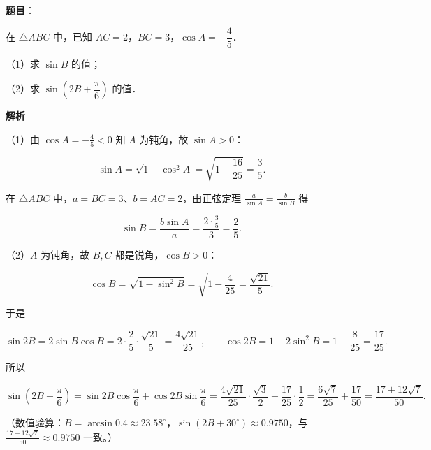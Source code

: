 \begin{answer}

\textbf{题目}：

在 $\triangle ABC$ 中，已知 $AC=2$，$BC=3$，$\cos A=-\dfrac{4}{5}$．

（1）求 $\sin B$ 的值；

（2）求 $\sin\left(2B+\dfrac{\pi}{6}\right)$ 的值．

\textbf{解析}

（1）由 $\cos A=-\frac45<0$ 知 $A$ 为钝角，故 $\sin A>0$：

\nopagebreak[4]
\[\sin A=\sqrt{1-\cos^2A}=\sqrt{1-\frac{16}{25}}=\frac35 .\]

在 $\triangle ABC$ 中，$a=BC=3$、$b=AC=2$，由正弦定理 $\frac{a}{\sin A}=\frac{b}{\sin B}$ 得

\nopagebreak[4]
\[\sin B=\frac{b\sin A}{a}=\frac{2\cdot\frac35}{3}=\frac25 .\]

（2）$A$ 为钝角，故 $B,C$ 都是锐角，$\cos B>0$：

\nopagebreak[4]
\[\cos B=\sqrt{1-\sin^2B}=\sqrt{1-\frac4{25}}=\frac{\sqrt{21}}5 .\]

于是

\nopagebreak[4]
\[\sin2B=2\sin B\cos B=2\cdot\frac25\cdot\frac{\sqrt{21}}5=\frac{4\sqrt{21}}{25},\qquad \cos2B=1-2\sin^2B=1-\frac8{25}=\frac{17}{25}.\]

所以

\nopagebreak[4]
\[\sin\left(2B+\frac\pi6\right)=\sin2B\cos\frac\pi6+\cos2B\sin\frac\pi6=\frac{4\sqrt{21}}{25}\cdot\frac{\sqrt3}2+\frac{17}{25}\cdot\frac12=\frac{6\sqrt7}{25}+\frac{17}{50}=\frac{17+12\sqrt7}{50}.\]

（数值验算：$B=\arcsin0.4\approx23.58^\circ$，$\sin\left(2B+30^\circ\right)\approx0.9750$，与 $\frac{17+12\sqrt7}{50}\approx0.9750$ 一致。）


\end{answer}
